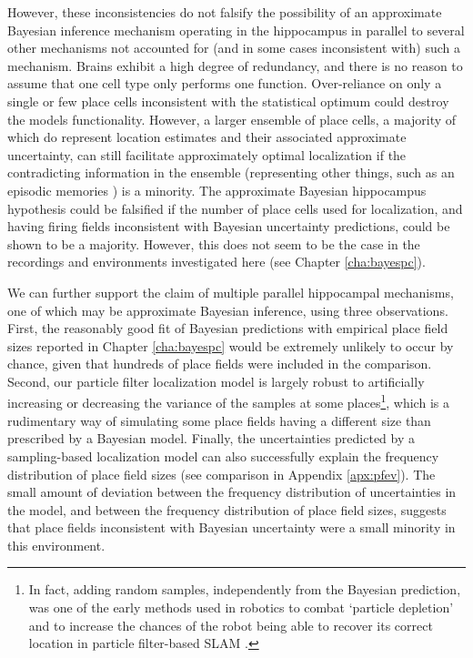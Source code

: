 However, these inconsistencies do not falsify the possibility of an approximate Bayesian inference mechanism operating in the hippocampus in parallel to several other mechanisms not accounted for (and in some cases inconsistent with) such a mechanism. Brains exhibit a high degree of redundancy, and there is no reason to assume that one cell type only performs one function. Over-reliance on only a single or few place cells inconsistent with the statistical optimum could destroy the models functionality. However, a larger ensemble of place cells, a majority of which do represent location estimates and their associated approximate uncertainty, can still facilitate approximately optimal localization if the contradicting information in the ensemble (representing other things, such as an episodic memories \citep{tulving1998episodic}) is a minority. The approximate Bayesian hippocampus hypothesis could be falsified if the number of place cells used for localization, and having firing fields inconsistent with Bayesian uncertainty predictions, could be shown to be a majority. However, this does not seem to be the case in the recordings and environments investigated here (see Chapter \ref{cha:bayespc}).

We can further support the claim of multiple parallel hippocampal mechanisms, one of which may be approximate Bayesian inference, using three observations. First, the reasonably good fit of Bayesian predictions with empirical place field sizes reported in Chapter \ref{cha:bayespc} would be extremely unlikely to occur by chance, given that hundreds of place fields were included in the comparison. Second, our particle filter localization model is largely robust to artificially increasing or decreasing the variance of the samples at some places\footnote{In fact, adding random samples, independently from the Bayesian prediction, was one of the early methods used in robotics to combat `particle depletion' and to increase the chances of the robot being able to recover its correct location in particle filter-based SLAM \citep{thrun2005probabilistic}.}, which is a rudimentary way of simulating some place fields having a different size than prescribed by a Bayesian model. Finally, the uncertainties predicted by a sampling-based localization model can also successfully explain the frequency distribution of place field sizes (see comparison in Appendix \ref{apx:pfev}). The small amount of deviation between the frequency distribution of uncertainties in the model, and between the frequency distribution of place field sizes, suggests that place fields inconsistent with Bayesian uncertainty were a small minority in this environment. 

